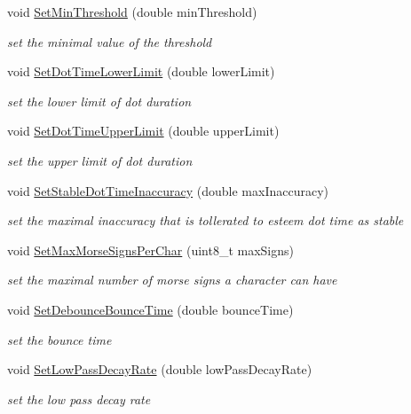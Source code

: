 \begin{DoxyCompactItemize}
void \hyperlink{classMorseDecode_a5607e1880a8a477af4e5ae5918463971}{Set\+Min\+Threshold} (double min\+Threshold)
\begin{DoxyCompactList}\small\item\em set the minimal value of the threshold \end{DoxyCompactList}\item 
void \hyperlink{classMorseDecode_a7ac2abe729dcd3cce8d53636e6a8c5b2}{Set\+Dot\+Time\+Lower\+Limit} (double lower\+Limit)
\begin{DoxyCompactList}\small\item\em set the lower limit of dot duration \end{DoxyCompactList}\item 
void \hyperlink{classMorseDecode_af73b94d8c654642982a38f5aa0a70beb}{Set\+Dot\+Time\+Upper\+Limit} (double upper\+Limit)
\begin{DoxyCompactList}\small\item\em set the upper limit of dot duration \end{DoxyCompactList}\item 
void \hyperlink{classMorseDecode_a95efbd76c6d03f97868e2e54b5c305cb}{Set\+Stable\+Dot\+Time\+Inaccuracy} (double max\+Inaccuracy)
\begin{DoxyCompactList}\small\item\em set the maximal inaccuracy that is tollerated to esteem dot time as stable \end{DoxyCompactList}\item 
void \hyperlink{classMorseDecode_a2b91a464dd74787aeba96e538ab167ee}{Set\+Max\+Morse\+Signs\+Per\+Char} (uint8\+\_\+t max\+Signs)
\begin{DoxyCompactList}\small\item\em set the maximal number of morse signs a character can have \end{DoxyCompactList}\item 
void \hyperlink{classMorseDecode_a2f5a27e26aa17b37f54fa5353ac02af8}{Set\+Debounce\+Bounce\+Time} (double bounce\+Time)
\begin{DoxyCompactList}\small\item\em set the bounce time \end{DoxyCompactList}\item 
void \hyperlink{classMorseDecode_ac85b7ab4f9e29a9ccb489df2d3501840}{Set\+Low\+Pass\+Decay\+Rate} (double low\+Pass\+Decay\+Rate)
\begin{DoxyCompactList}\small\item\em set the low pass decay rate \end{DoxyCompactList}\item 

\end{DoxyCompactItemize}
